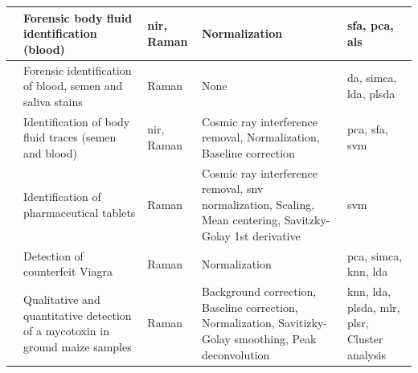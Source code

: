 \begin{scriptsize}
\begin{longtable}{|m{1.5cm}|m{3cm}|m{1.5cm}|m{4cm}|m{4cm}|}
		\hline 
		\cite{virkler2010raman} & Forensic body fluid identification (blood) & \gls{nir}, \newline Raman & Normalization & \gls{sfa}, \gls{pca}, \gls{als} \\ 
		
		\hline 
		\cite{sikirzhytski2010discriminant} & Forensic identification of blood, semen and saliva stains & Raman & None & \gls{da}, \gls{simca}, \gls{lda}, \gls{plsda} \\ 
		
		\hline 
		\cite{sikirzhytski2012advanced} & Identification of body fluid traces (semen and blood) & \gls{nir}, \newline Raman & Cosmic ray interference removal, Normalization, Baseline correction & \gls{pca}, \gls{sfa}, \gls{svm} \\ 
		
		\hline 
		\cite{roggo2010identification} & Identification of pharmaceutical tablets & Raman & Cosmic ray interference removal, \gls{snv} normalization, Scaling, Mean centering, Savitzky-Golay 1st derivative & \gls{svm} \\ 
		
		\hline 
		\cite{sacre2011detection} & Detection of counterfeit Viagra{\textregistered} & Raman & Normalization & \gls{pca}, \gls{simca}, \gls{knn}, \gls{lda} \\ 
		
		\hline 
		\cite{lee2013application} & Qualitative and quantitative detection of a mycotoxin in ground maize samples & Raman & Background correction, Baseline correction, Normalization, Savitizky-Golay smoothing, Peak deconvolution & \gls{knn}, \gls{lda}, \gls{plsda}, \gls{mlr}, \gls{plsr}, Cluster analysis \\ 
		
		\hline 
		
	
	\end{longtable}
\end{scriptsize}





